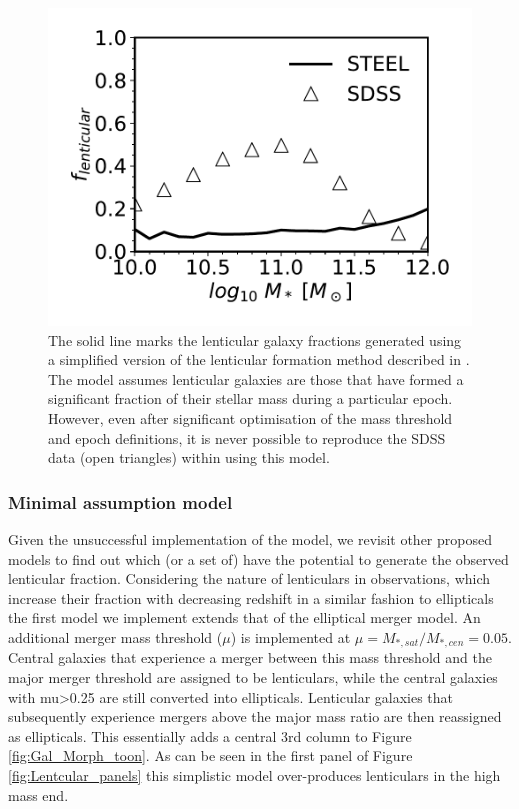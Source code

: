 \begin{figure}
  \includegraphics[width=\linewidth]{Figures/Chapter5/CookModel.pdf}
    \caption{The solid line marks the lenticular galaxy fractions generated using a simplified version of the lenticular formation method described in
    \cite{Cook2009Two-phaseFormation}. The model assumes lenticular galaxies are those that have formed a significant fraction of their stellar mass during a particular epoch. However, even after significant optimisation of the mass
    threshold and epoch definitions, it is never possible to reproduce the SDSS
    data (open triangles) within \steel using this model.}
    \label{fig:CookeModel}
\end{figure}

\subsubsection{Minimal assumption model}

Given the unsuccessful implementation of the \citet{Cook2009Two-phaseFormation} model, we revisit other proposed models to find out which (or a set of) have the potential to generate the observed lenticular fraction. Considering the nature of lenticulars in observations, which increase their fraction with decreasing redshift in a similar fashion to ellipticals \cite{Huertas-Company2015TheGrowth,Huertas-Company2016MassCANDELS} the first model we implement extends that of the elliptical merger model. An additional merger mass threshold ($\mu$) is implemented at $\mu = M_{*, sat}/M_{*, cen} = 0.05$. Central galaxies that experience a merger between this mass threshold and the major merger threshold are assigned to be lenticulars, while the central galaxies with mu>0.25 are still converted into ellipticals. Lenticular galaxies that subsequently experience mergers above the major mass ratio are then reassigned as ellipticals. This essentially adds a central 3rd column to Figure \ref{fig:Gal_Morph_toon}. As can be seen in the first panel of Figure \ref{fig:Lentcular_panels} this simplistic model over-produces lenticulars in the high mass end. 

